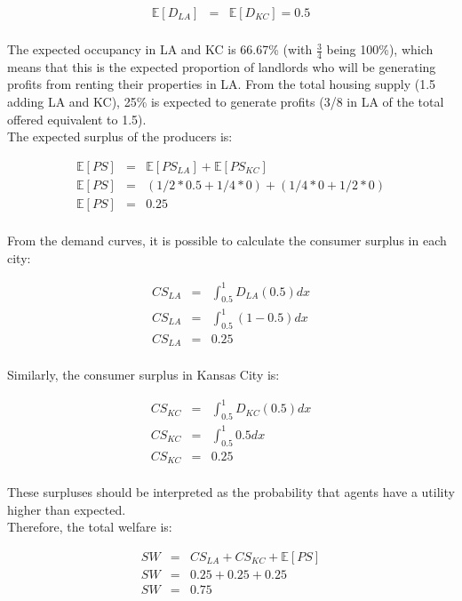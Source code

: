 \begin{eqnarray*}
    \mathbb{E}[D_{LA}] &=& \mathbb{E}[D_{KC}] = 0.5\\
\end{eqnarray*}
    
The expected occupancy in LA and KC is 66.67\% (with \( \frac{3}{4} \) being 100\%), which means that this is the expected proportion of landlords who will be generating profits from renting their properties in LA. From the total housing supply (1.5 adding LA and KC), 25\% is expected to generate profits (3/8 in LA of the total offered equivalent to 1.5). \\


The expected surplus of the producers is: 


\begin{eqnarray*}
    \mathbb{E}[PS] &=& \mathbb{E}[PS_{LA}] + \mathbb{E}[PS_{KC}]\\
    \mathbb{E}[PS] &=& (1/2*0.5 + 1/4 * 0) + (1/4 * 0 + 1/2 * 0)\\
    \mathbb{E}[PS] &=& 0.25\\
\end{eqnarray*}

From the demand curves, it is possible to calculate the consumer surplus in each city:

\begin{eqnarray*}
    CS_{LA} &=& \int_{0.5}^{1}  D_{LA}(0.5) dx\\
    CS_{LA} &=& \int_{0.5}^{1}  (1 - 0.5)dx\\
    CS_{LA} &=& 0.25\\
\end{eqnarray*}

Similarly, the consumer surplus in Kansas City is:

\begin{eqnarray*}
    CS_{KC} &=& \int_{0.5}^{1}  D_{KC}(0.5) dx\\
    CS_{KC} &=& \int_{0.5}^{1}  0.5dx\\
    CS_{KC} &=& 0.25\\
\end{eqnarray*}

These surpluses should be interpreted as the probability that agents have a utility higher than expected.\\

Therefore, the total welfare is:

\begin{eqnarray*}
    SW &=& CS_{LA} + CS_{KC} + \mathbb{E}[PS]\\
    SW &=& 0.25 + 0.25 + 0.25\\
    SW &=& 0.75\\
\end{eqnarray*}

